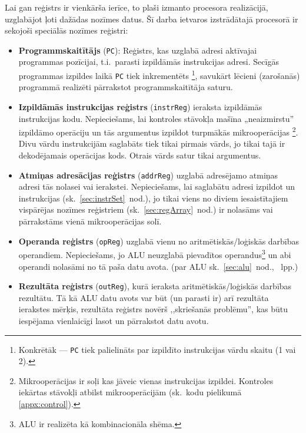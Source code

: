 	\pagebreak[2]
	Lai gan reģistrs ir vienkārša ierīce, to plaši izmanto procesora
	realizācijā, uzglabājot ļoti dažādas nozīmes datus.
	Šī darba ietvaros izstrādātajā procesorā ir sekojoši speciālās nozīmes reģistri:
	\pagebreak[1]
	\begin{itemize}
		\item \textbf{Programmskaitītājs} (\texttt{PC}):
			Reģistrs, kas uzglabā adresi aktīvajai programmas pozīcijai,
			t.i.~parasti izpildāmās instrukcijas adresi. Secīgās programmas
			izpildes laikā \texttt{PC} tiek inkrementēts%
			\footnote{Konkrētāk — \texttt{PC} tiek palielināts par
				izpildīto instrukcijas vārdu skaitu (1 vai 2).},
			savukārt lēcieni (zarošanās)
			programmā realizēti pārrakstot programmskaitītāja saturu.\pagebreak[2]
		\item \textbf{Izpildāmās instrukcijas reģistrs} (\texttt{instrReg})
			ieraksta izpildāmās instrukcijas kodu.
			Nepieciešams, lai kontroles stāvokļa mašīna „neaizmirstu”
			izpildāmo operāciju un tās argumentus izpildot
			turpmākās mikro\-operācijas%
			\footnote{Mikrooperācijas ir soļi kas jāveic vienas instrukcijas
				izpildei. Kontroles iekārtas stāvokļi atbilst mikrooperācijām
				(sk.~kodu pielikumā \ref{appx:control}).}.
			Divu vārdu instrukcijām saglabāts
			tiek tikai pirmais vārds, jo tikai tajā ir dekodējamais
			operācijas kods. Otrais vārds satur tikai argumentus.
		\item \textbf{Atmiņas adresācijas reģistrs} (\texttt{addrReg})
			uzglabā adresējamo atmiņas adresi tās nolasei
			vai ierakstei. Nepieciešams, lai saglabātu adresi izpildot
			 un  instrukcijas (sk.~\ref{sec:instrSet}~nod.),
			jo tikai viens no diviem iesaistītajiem vispārējas nozīmes reģistriem
			(sk.~\ref{sec:regArray}~nod.) ir nolasāms vai pārrakstāms
			vienā mikrooperācijas solī.
		\item \textbf{Operanda reģistrs} (\texttt{opReg})
			uzglabā vienu no aritmētiskās/loģiskās darbības
			ope\-ran\-diem. Nepieciešams, jo ALU neuzglabā pievadītos
			operandus\footnote{ALU ir realizēta kā kombinacionāla shēma.}
			un abi operandi nolasāmi no tā paša datu avota.
			(par ALU sk.~\ref{sec:alu}~nod., \pageref{sec:alu}~lpp.)
		\item \textbf{Rezultāta reģistrs} (\texttt{outReg}),
			kurā ieraksta aritmētiskās/loģiskās darbības rezultātu.
			Tā kā ALU datu avots var būt (un parasti ir) arī rezultāta
			ierakstes mērķis, rezultāta reģistrs novērš 
			,,skriešanās problēmu'', kas būtu
			iespējama vienlaicīgi lasot un pārrakstot datu avotu.
	\end{itemize}

